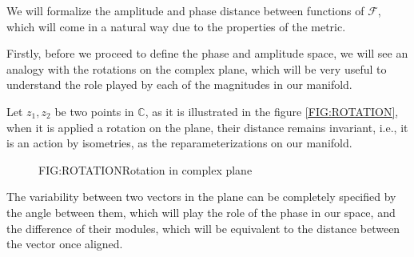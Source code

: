 
We will formalize the amplitude and phase distance between functions of
$\mathcal{F}$, which will come in a natural way due to the properties of the
metric.

Firstly, before we proceed to define the phase and amplitude space, we will see
an analogy with the rotations on the complex plane, which will be very useful to
understand the role played by each of the magnitudes in our manifold.

Let  $z_1, z_2$ be two points in $\mathbb{C}$, as it is illustrated in the
figure \ref{FIG:ROTATION}, when it is applied a rotation on the plane, their
distance remains invariant, i.e., it is an action by isometries, as the
reparameterizations on our manifold.


\begin{figure}[Rotation in complex plane]{FIG:ROTATION}{Rotation in complex plane}

%
%
%
%
\end{figure}

The variability between two vectors in the plane can be completely specified by
the angle between them, which will play the role of the phase in our space, and
the difference of their modules, which will be equivalent to the distance
between the vector once aligned.

